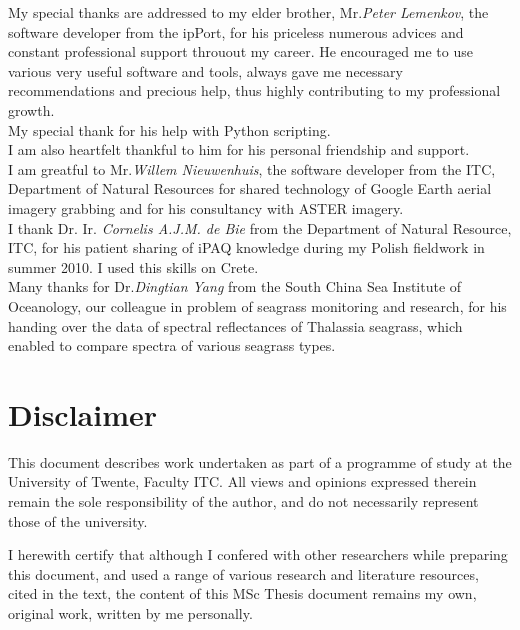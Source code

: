 \documentclass[10pt, a4paper]{article}
\begin{document}
My special thanks are addressed to my elder brother, Mr.\textit{Peter Lemenkov}, the software developer from the ipPort, for his priceless numerous advices and constant professional support throuout my career. He encouraged me to use various very useful software and tools, always gave me necessary recommendations and precious help, thus highly contributing to my professional growth. \\ My special thank for his help with Python scripting. \\
I am also heartfelt thankful to him for his personal friendship and support. 
\vspace{1mm}\\
I am greatful to Mr.\textit{Willem Nieuwenhuis}, the software developer from the ITC, Department of Natural Resources for shared technology of Google Earth aerial imagery grabbing and for his consultancy with ASTER imagery. 
\vspace{1mm}\\
I thank Dr. Ir. \textit{Cornelis A.J.M. de Bie} from the Department of Natural Resource, ITC, for his patient sharing of iPAQ knowledge during my Polish fieldwork in summer 2010. I used this skills on Crete. 
\vspace{1mm}\\
Many thanks for Dr.\textit{Dingtian Yang} from the South China Sea Institute of Oceanology, our colleague in problem of seagrass monitoring and research, for his handing over the data of spectral reflectances of Thalassia seagrass, which enabled to compare spectra of various seagrass types. 

\pagebreak

\section*{Disclaimer}
		This document describes work undertaken as part of a programme of study at the University of
		Twente, Faculty ITC. All views and opinions expressed therein remain the sole responsibility of
		the author, and do not necessarily represent those of the university.\\

\vspace{3em}

		I herewith certify that although I confered with other researchers while preparing this document, and used a range of various research and literature 			resources, cited in the text, the content of this MSc Thesis document remains my own, original work, written by me personally. \\
\end{document}
